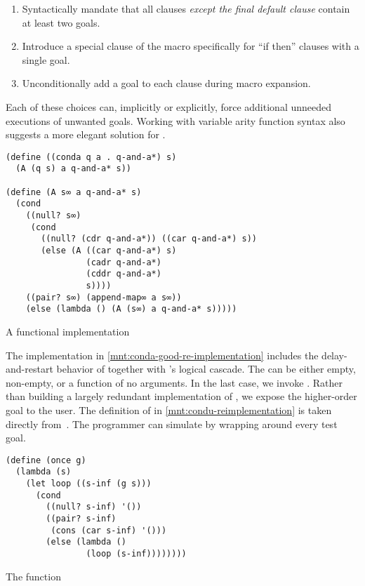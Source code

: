 \documentclass[sigplan,draft,balance,pbalance,natbib=false]{acmart}
\begin{document}
\begin{enumerate}

\item Syntactically mandate that all clauses \emph{except the final
    default clause} contain at least two goals.

\item Introduce a special clause of the  macro
  specifically for \enquote{if then} clauses with a single goal.

\item Unconditionally add a  goal to each clause
  during macro expansion.

\end{enumerate}

Each of these choices can, implicitly or explicitly, force additional
unneeded executions of unwanted goals. Working with variable arity
function syntax also suggests a more elegant solution for
.

\begin{listing}
  \begin{verbatim}
(define ((conda q a . q-and-a*) s)
  (A (q s) a q-and-a* s))

(define (A s∞ a q-and-a* s)
  (cond
    ((null? s∞)
     (cond
       ((null? (cdr q-and-a*)) ((car q-and-a*) s))
       (else (A ((car q-and-a*) s)
                (cadr q-and-a*)
                (cddr q-and-a*)
                s))))
    ((pair? s∞) (append-map∞ a s∞))
    (else (lambda () (A (s∞) a q-and-a* s)))))
  \end{verbatim}
  \caption{A functional  implementation}
  \label{mnt:conda-good-re-implementation}
\end{listing}

The implementation in \cref{mnt:conda-good-re-implementation} includes
the delay-and-restart behavior of  together with
's logical cascade. The  can be
either empty, non-empty, or a function of no arguments. In the last
case, we invoke . Rather than building a largely
redundant implementation of , we expose the
higher-order goal  to the user. The definition of
 in \cref{mnt:condu-reimplementation} is taken
directly from~\cite{friedman2018reasoned}. The programmer can simulate
 by wrapping  around every test
goal.

\begin{listing}
  \begin{verbatim}
(define (once g)
  (lambda (s)
    (let loop ((s-inf (g s)))
      (cond
        ((null? s-inf) '())
        ((pair? s-inf)
         (cons (car s-inf) '()))
        (else (lambda ()
                (loop (s-inf))))))))
  \end{verbatim}
  \caption{The  function} %
  \label{mnt:condu-reimplementation}
\end{listing}
\end{document}
